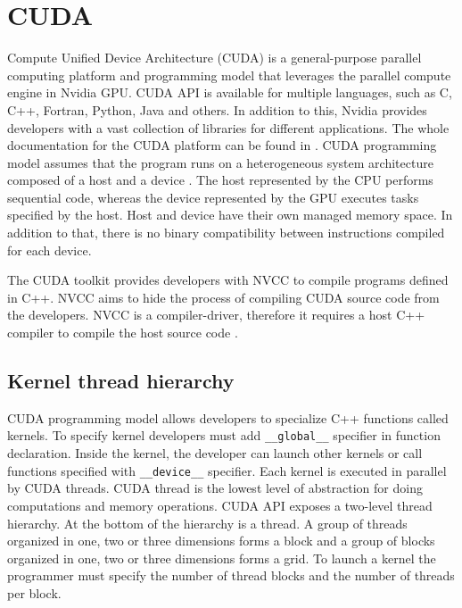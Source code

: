\section{CUDA}

Compute Unified Device Architecture (CUDA) is a general-purpose parallel computing platform and programming model that leverages the parallel compute engine in Nvidia GPU.
CUDA API is available for multiple languages, such as C, C++, Fortran, Python, Java and others.
In addition to this, Nvidia provides developers with a vast collection of libraries for different applications.
The whole documentation for the CUDA platform can be found in \cite{CUDAProgramming}.
\newpage
CUDA programming model assumes that the program runs on a heterogeneous system architecture composed of a host and a device \cite{CUDAProgramming}.
The host represented by the CPU performs sequential code, whereas the device represented by the GPU executes tasks specified by the host.
Host and device have their own managed memory space.
In addition to that, there is no binary compatibility between instructions compiled for each device.

The CUDA toolkit provides developers with NVCC to compile programs defined in C++.
NVCC aims to hide the process of compiling CUDA source code from the developers.
NVCC is a compiler-driver, therefore it requires a host C++ compiler to compile the host source code \cite{NVIDIANVCC}.


\subsection{Kernel thread hierarchy}

CUDA programming model allows developers to specialize C++ functions called kernels.
To specify kernel developers must add \texttt{\_\_global\_\_} specifier in function declaration.
Inside the kernel, the developer can launch other kernels or call functions specified with \texttt{\_\_device\_\_} specifier.
Each kernel is executed in parallel by CUDA threads.
CUDA thread is the lowest level of abstraction for doing computations and memory operations.
CUDA API exposes a two-level thread hierarchy.
At the bottom of the hierarchy is a thread.
A group of threads organized in one, two or three dimensions forms a block and a group of blocks organized in one, two or three dimensions forms a grid.
To launch a kernel the programmer must specify the number of thread blocks and the number of threads per block.

